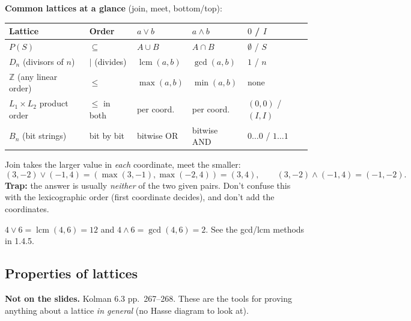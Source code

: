 \documentclass{fkt-notes}
\DeclareMathOperator{\lcm}{lcm}
\newcommand{\notslides}[1]{\par\noindent\textbf{Not on the slides.} #1\par}
\theoremstyle{definition}
\begin{document}
\textbf{Common lattices at a glance} (join, meet, bottom/top):
\begin{center}
  \renewcommand{\arraystretch}{1.3}
  \begin{tabular}{@{}lllll@{}}
    \toprule
    Lattice                         & Order            & $a \vee b$  & $a \wedge b$ & $0$ / $I$               \\
    \midrule
    $P(S)$                          & $\subseteq$      & $A \cup B$  & $A \cap B$   & $\emptyset$ / $S$       \\
    $D_n$ (divisors of $n$)         & $\mid$ (divides) & $\lcm(a,b)$ & $\gcd(a,b)$  & $1$ / $n$               \\
    $\mathbb{Z}$ (any linear order) & $\le$            & $\max(a,b)$ & $\min(a,b)$  & none                    \\
    $L_1 \times L_2$ product order  & $\le$ in both    & per coord.  & per coord.   & $(0,0)$ / $(I,I)$       \\
    $B_n$ (bit strings)             & bit by bit       & bitwise OR  & bitwise AND  & $0\ldots0$ / $1\ldots1$ \\
    \bottomrule
  \end{tabular}
\end{center}
%

\begin{example}
  Join takes the larger value in \emph{each} coordinate, meet the smaller:
  \[
    (3,-2) \vee (-1,4) = (\max(3,-1), \max(-2,4)) = (3, 4), \qquad
    (3,-2) \wedge (-1,4) = (-1, -2).
  \]
  \textbf{Trap:} the answer is usually \emph{neither} of the two given
  pairs. Don't confuse this with the lexicographic order (first
  coordinate decides), and don't add the coordinates.
\end{example}

\begin{example}
  $4 \vee 6 = \lcm(4,6) = 12$ and $4 \wedge 6 = \gcd(4,6) = 2$.
  See the gcd/lcm methods in 1.4.5.
\end{example}

\subsection{Properties of lattices}
%
\notslides{Kolman 6.3 pp.~267--268. These are the tools for proving
  anything about a lattice \emph{in general} (no Hasse diagram to look
  at).}
\end{document}
